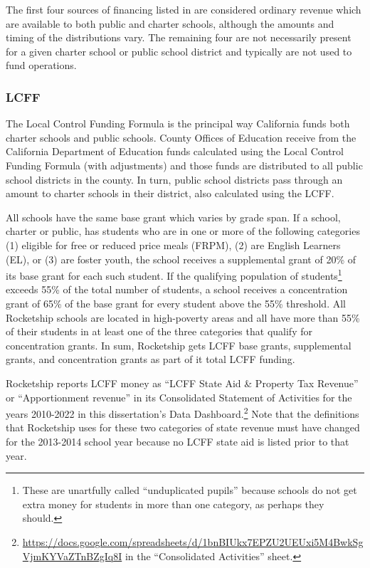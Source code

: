 The first four sources of financing listed in  are considered ordinary revenue which are available to both public and charter schools, although the amounts and timing of the distributions vary. The remaining four are not necessarily present for a given charter school or public school district and typically are not used to fund operations.

\subsubsection{LCFF}%
\label{sec:lcff}\indent%

The Local Control Funding Formula is the principal way California funds both charter schools and public schools. County Offices of Education receive from the California Department of Education funds calculated using the Local Control Funding Formula (with adjustments) and those funds are distributed to all public school districts in the county. In turn, public school districts 
pass through an amount to charter schools in their district, also calculated using the LCFF.

All schools have the same base grant which varies by grade span. If a school, charter or public, has students who are in one or more of the following categories (1) eligible for free or reduced price meals (FRPM), (2) are English Learners (EL), or (3) are foster youth, the school receives a supplemental grant of 20\% of its base grant for each such student. If the qualifying population of students\footnote{These are unartfully called ``unduplicated pupils'' because schools do not get extra money for students in more than one category, as perhaps they should.} exceeds 55\% of the total number of students, a school receives a concentration grant of 65\% of the base grant for every student above the 55\% threshold. All Rocketship schools are located in high-poverty areas and all have more than 55\% of their students in at least one of the three categories that qualify for concentration grants. In sum, Rocketship gets LCFF base grants, supplemental grants, and concentration grants as part of it total LCFF funding.

Rocketship reports LCFF money as ``LCFF State Aid \& Property Tax Revenue'' or ``Apportionment revenue'' in its Consolidated Statement of Activities for the years 2010-2022 in this dissertation's Data Dashboard.\footnote{\url{https://docs.google.com/spreadsheets/d/1bnBIUkx7EPZU2UEUxi5M4BwkSgVjmKYVaZTnBZgIq8I} in the ``Consolidated Activities'' sheet.} Note that the definitions that Rocketship uses for these two categories of state revenue must have changed for the 2013-2014 school year because no LCFF state aid is listed prior to that year.


